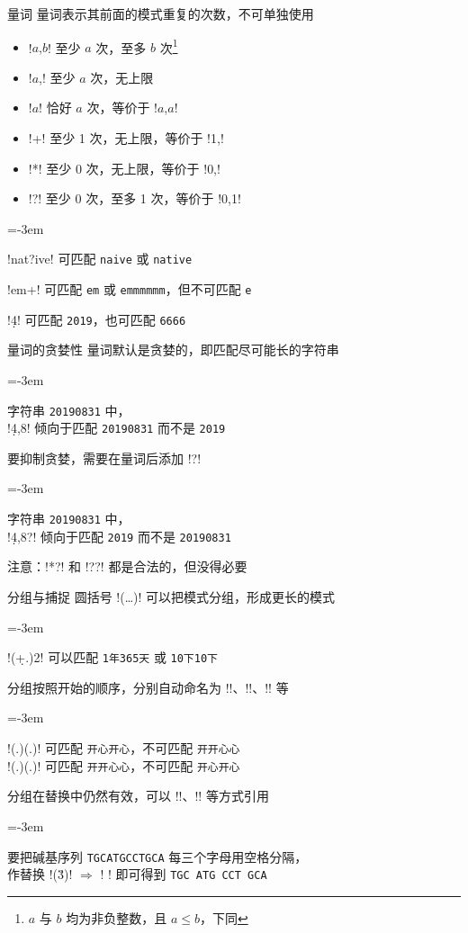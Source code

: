 \documentclass{beamer}
\makeatletter
\def\mymikudark#1{{\color{beamer@blendedblue}#1}}
\newcommand{\txt}[1]{\mymikudark{\texttt{#1}}}
\def\replace{{\color{black} $\Rightarrow$ }}
\newenvironment{igsimple}%
	{\begin{description*}\leftskip=-3em\relax\item[例：\kern-1ex]}%
	{\end{description*}}
\makeatother
\begin{document}
\begin{frame}[fragile]{量词}
	量词表示其前面的模式重复的次数，不可单独使用\par
	\begin{itemize}
		\item !{$a$,$b$}! 至少 $a$ 次，至多 $b$ 次\footnote{$a$ 与 $b$ 均为非负整数，且 $a\leq b$，下同}
		\item !{$a$,}! 至少 $a$ 次，无上限
		\item !{$a$}! 恰好 $a$ 次，等价于 !{$a$,$a$}!
		\item !+! 至少 1 次，无上限，等价于 !{1,}!
		\item !*! 至少 0 次，无上限，等价于 !{0,}!
		\item !?! 至少 0 次，至多 1 次，等价于 !{0,1}!
	\end{itemize}
	\vspace*{-0.5em}
	\begin{igsimple}
		!nat?ive! 可匹配 \txt{naive} 或 \txt{native}\par
		!em+! 可匹配 \txt{em} 或 \txt{emmmmmm}，但不可匹配 \txt{e}\par
		!\d{4}! 可匹配 \txt{2019}，也可匹配 \txt{6666}
	\end{igsimple}
\end{frame}

\begin{frame}[fragile]{量词的贪婪性}
	量词默认是贪婪的，即匹配尽可能长的字符串
	\begin{igsimple}
		字符串 \txt{20190831} 中， \\
		!\d{4,8}! 倾向于匹配 \txt{20190831} 而不是 \txt{2019}
	\end{igsimple}\par
	要抑制贪婪，需要在量词后添加 !?!
	\begin{igsimple}
		字符串 \texttt{20190831} 中， \\
		!\d{4,8}?! 倾向于匹配 \txt{2019} 而不是 \txt{20190831}
	\end{igsimple}
	注意：!*?! 和 !??! 都是合法的，但没得必要
\end{frame}

\begin{frame}[fragile]{分组与捕捉}
	圆括号 !(…)! 可以把模式分组，形成更长的模式
	\begin{igsimple}
		!(\d+.){2}! 可以匹配 \txt{1年365天} 或 \txt{10下10下}
	\end{igsimple}\par
	分组按照开始的顺序，分别自动命名为 !\1!、!\2!、!\3! 等
	\begin{igsimple}
		!(.)(.)\1\2! 可匹配 \txt{开心开心}，不可匹配 \txt{开开心心} \\
		!(.)\1(.)\2! 可匹配 \txt{开开心心}，不可匹配 \txt{开心开心}
	\end{igsimple}
	分组在替换中仍然有效，可以 !\1!、!\2! 等方式引用
	\begin{igsimple}
		要把碱基序列 \txt{TGCATGCCTGCA} 每三个字母用空格分隔，\\
		作替换 !(\u{3})! \replace !\1 ! 即可得到 \txt{TGC ATG CCT GCA }
	\end{igsimple}
\end{frame}
\end{document}
